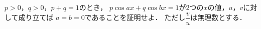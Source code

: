 \documentclass[../../main.tex]{subfiles}
\begin{document}
$p>0$，$q>0$，$p+q=1$のとき，
$p\cos ax+q\cos bx=1$が2つの$x$の値，$u$，$v$に対して成り立てば
$a=b=0$であることを証明せよ．
ただし$\displaystyle\dfrac{v}{u}$は無理数とする．
\end{document}
